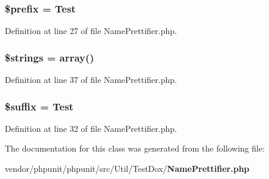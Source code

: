 \subsubsection[{\$prefix}]{\setlength{\rightskip}{0pt plus 5cm}\$prefix = \textquotesingle{}Test\textquotesingle{}\hspace{0.3cm}{\ttfamily [protected]}}\label{class_p_h_p_unit___util___test_dox___name_prettifier_a09e8cf95b9d29955a0bfabca9b420edc}


Definition at line 27 of file Name\+Prettifier.\+php.

\subsubsection[{\$strings}]{\setlength{\rightskip}{0pt plus 5cm}\$strings = array()\hspace{0.3cm}{\ttfamily [protected]}}\label{class_p_h_p_unit___util___test_dox___name_prettifier_aa5b5c2d571df2c930c127078012a01fc}


Definition at line 37 of file Name\+Prettifier.\+php.

\subsubsection[{\$suffix}]{\setlength{\rightskip}{0pt plus 5cm}\$suffix = \textquotesingle{}Test\textquotesingle{}\hspace{0.3cm}{\ttfamily [protected]}}\label{class_p_h_p_unit___util___test_dox___name_prettifier_a8a4ee1ac7ecdf8ef590598ad43b23e0a}


Definition at line 32 of file Name\+Prettifier.\+php.



The documentation for this class was generated from the following file\+:\begin{DoxyCompactItemize}
\item 
vendor/phpunit/phpunit/src/\+Util/\+Test\+Dox/{\bf Name\+Prettifier.\+php}\end{DoxyCompactItemize}
